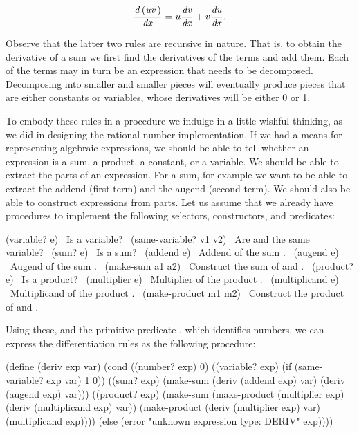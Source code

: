 $$
\frac{{\it d\,(uv\,)}}{{\it dx}}
=
u \frac{{\it dv}}{{\it dx}} + v \frac{{\it du}}{{\it dx}}.
$$

\noindent
Observe that the latter two rules are recursive in nature.  That is, to obtain
the derivative of a sum we first find the derivatives of the terms and add
them.  Each of the terms may in turn be an expression that needs to be
decomposed.  Decomposing into smaller and smaller pieces will eventually
produce pieces that are either constants or variables, whose derivatives will
be either 0 or 1.

To embody these rules in a procedure we indulge in a little wishful thinking,
as we did in designing the rational-number implementation.  If we had a means
for representing algebraic expressions, we should be able to tell whether an
expression is a sum, a product, a constant, or a variable.  We should be able
to extract the parts of an expression.  For a sum, for example we want to be
able to extract the addend (first term) and the augend (second term).  We
should also be able to construct expressions from parts.  Let us assume that we
already have procedures to implement the following selectors, constructors, and
predicates:

\begin{codeBlock}
(variable? e)            ~\textrm{Is  a variable?}~
(same-variable? v1 v2)   ~\textrm{Are  and  the same variable?}~
(sum? e)                 ~\textrm{Is  a sum?}~
(addend e)               ~\textrm{Addend of the sum .}~
(augend e)               ~\textrm{Augend of the sum .}~
(make-sum a1 a2)         ~\textrm{Construct the sum of  and .}~
(product? e)             ~\textrm{Is  a product?}~
(multiplier e)           ~\textrm{Multiplier of the product .}~
(multiplicand e)         ~\textrm{Multiplicand of the product .}~
(make-product m1 m2)     ~\textrm{Construct the product of  and .}~
\end{codeBlock}

\noindent
Using these, and the primitive predicate , which identifies
numbers, we can express the differentiation rules as the following procedure:

\begin{codeBlock}
(define (deriv exp var)
  (cond ((number? exp) 0)
        ((variable? exp) (if (same-variable? exp var)
                             1
                             0))
        ((sum? exp) (make-sum (deriv (addend exp)
                                     var)
                              (deriv (augend exp)
                                     var)))
        ((product? exp)
         (make-sum
           (make-product (multiplier exp)
                         (deriv (multiplicand exp)
                                var))
           (make-product (deriv (multiplier exp)
                                var)
                         (multiplicand exp))))
        (else
         (error "unknown expression type: DERIV"
                exp))))
\end{codeBlock}

